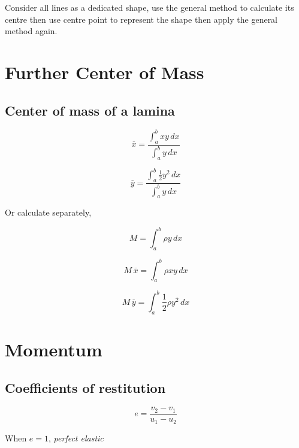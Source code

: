 \documentclass[a4paper,9pt]{scrartcl}
\begin{document}
    Consider all lines as a dedicated shape, use the general method to calculate its centre then use centre point to represent the shape then apply the general method again.


    \section{Further Center of Mass}

    \subsection{Center of mass of a lamina}

    \begin{displaymath}
        \overline{x} = \frac{\int_{a}^{b} xy \,dx}{\int_{a}^{b} y \,dx}
    \end{displaymath}

    \begin{displaymath}
        \overline{y} = \frac{\int_{a}^{b} \frac{1}{2}y^2 \,dx}{\int_{a}^{b} y \,dx}
    \end{displaymath}

    Or calculate separately,

    \begin{displaymath}
        M = \int_{a}^{b} {\rho}y \,dx
    \end{displaymath}

    \begin{displaymath}
        M\,\overline{x} = \int_{a}^{b} {\rho}xy \,dx
    \end{displaymath}

    \begin{displaymath}
        M\,\overline{y} = \int_{a}^{b} \frac{1}{2} {\rho}y^2 \,dx
    \end{displaymath}


    \section{Momentum}

    \subsection{Coefficients of restitution}

    \begin{displaymath}
        e = \frac{v_2-v_1}{u_1-u_2}
    \end{displaymath}

    When $e=1$, \textit{perfect elastic}
\end{document}
